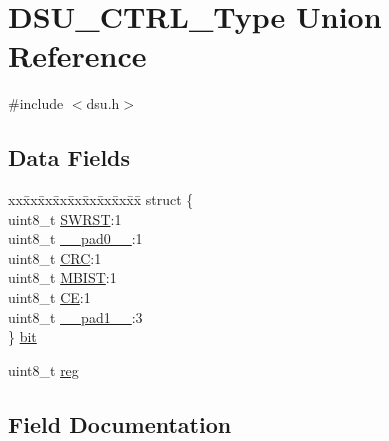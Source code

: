 \hypertarget{union_d_s_u___c_t_r_l___type}{}\section{D\+S\+U\+\_\+\+C\+T\+R\+L\+\_\+\+Type Union Reference}
\label{union_d_s_u___c_t_r_l___type}


{\ttfamily \#include $<$dsu.\+h$>$}

\subsection*{Data Fields}
\begin{DoxyCompactItemize}
\item 
\begin{tabbing}
xx\=xx\=xx\=xx\=xx\=xx\=xx\=xx\=xx\=\kill
struct \{\\
\>uint8\_t \mbox{\hyperlink{union_d_s_u___c_t_r_l___type_a9334d5ac0548802c90a8129c52c8e490}{SWRST}}:1\\
\>uint8\_t \mbox{\hyperlink{union_d_s_u___c_t_r_l___type_a8b4eebe79ded0459acec2f4950102ba3}{\_\_pad0\_\_}}:1\\
\>uint8\_t \mbox{\hyperlink{union_d_s_u___c_t_r_l___type_a3c0a02ddbd40208239429e7c15046afe}{CRC}}:1\\
\>uint8\_t \mbox{\hyperlink{union_d_s_u___c_t_r_l___type_aab65dd9b182f6be2254611db5d495217}{MBIST}}:1\\
\>uint8\_t \mbox{\hyperlink{union_d_s_u___c_t_r_l___type_a0d48069acca0d7c87aa3b848f2959714}{CE}}:1\\
\>uint8\_t \mbox{\hyperlink{union_d_s_u___c_t_r_l___type_a77f12d2e278bd5c07712648ac0df5e08}{\_\_pad1\_\_}}:3\\
\} \mbox{\hyperlink{union_d_s_u___c_t_r_l___type_a218f12eb6a8728d8d9b1e19c56e20fb2}{bit}}\\

\end{tabbing}\item 
uint8\+\_\+t \mbox{\hyperlink{union_d_s_u___c_t_r_l___type_a9428adc9af4653a2050e2536b55dec8d}{reg}}
\end{DoxyCompactItemize}


\subsection{Field Documentation}
\mbox{\label{union_d_s_u___c_t_r_l___type_a8b4eebe79ded0459acec2f4950102ba3}} 

